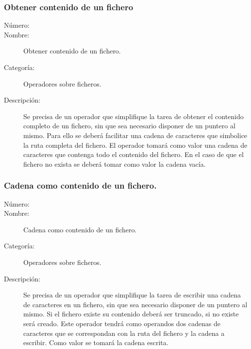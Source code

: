 \subsubsection{Obtener contenido de un fichero}
\begin{framed}
	\begin{description}
		\item [Número:] \cn
		\item [Nombre:] Obtener contenido de un fichero.
		\item [Categoría:] Operadores sobre ficheros.
		\item [Descripción:] Se precisa de un operador que simplifique la tarea de obtener el contenido completo de un fichero, sin que sea necesario disponer de un 
		puntero al mismo. Para ello se deberá facilitar una cadena de caracteres que simbolice la ruta completa del fichero. El operador tomará como valor
		una cadena de caracteres que contenga todo el contenido del fichero. En el caso de que el fichero no exista se deberá tomar como valor la cadena vacía.
	\end{description}
\end{framed}

\subsubsection{Cadena como contenido de un fichero.}
\begin{framed}
	\begin{description}
		\item [Número:] \cn
		\item [Nombre:] Cadena como contenido de un fichero.
		\item [Categoría:] Operadores sobre ficheros.
		\item [Descripción:] Se precisa de un operador que simplifique la tarea de escribir una cadena de caracteres en un fichero, sin que sea necesario 
		disponer de un puntero al mismo. Si el fichero existe su contenido deberá ser truncado, si no existe será creado. Este operador tendrá como operandos dos cadenas 
		de caracteres que se correspondan con la ruta del fichero y la cadena a escribir. Como valor se tomará la cadena escrita.
	\end{description}
\end{framed}


